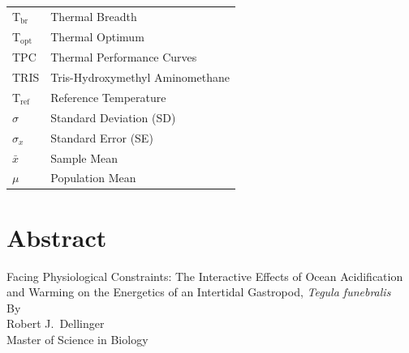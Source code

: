 \documentclass{CSUNthesis}
\begin{document}
\begin{spacing}{1}
\begin{center}
\begin{tabular}{@{}ll@{}}
T$_\mathrm{br}$ & Thermal Breadth \\
T$_\mathrm{opt}$ & Thermal Optimum \\
TPC      & Thermal Performance Curves \\
TRIS     & Tris-Hydroxymethyl Aminomethane \\
T$_\mathrm{ref}$ & Reference Temperature \\
$\sigma$    & Standard Deviation (SD) \\
$\sigma_x$  & Standard Error (SE) \\
$\bar{x}$   & Sample Mean \\
$\mu$       & Population Mean \\
\end{tabular}
\end{center}
\end{spacing}


\cleardoublepage
\pagestyle{plain}
{}
\chapter*{Abstract}

\begin{center}
  Facing Physiological Constraints: The Interactive Effects of Ocean Acidification and Warming
  on the Energetics of an Intertidal Gastropod, \textit{Tegula funebralis}\\[0.8em]
  By\\[0.2em]
  Robert J.~Dellinger\\[0.4em]
  Master of Science in Biology
\end{center}
\end{document}

